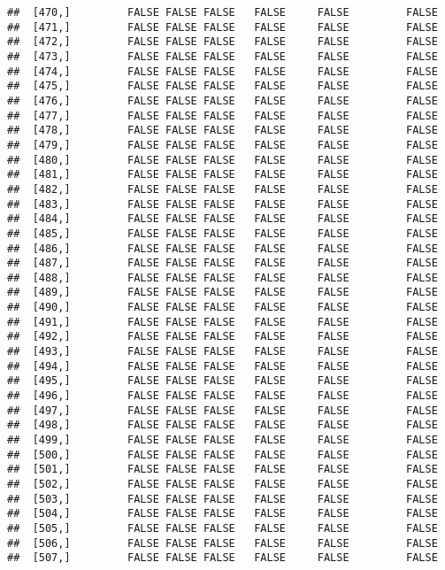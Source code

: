 \documentclass[
]{article}
\begin{document}
\begin{verbatim}
##  [470,]         FALSE FALSE FALSE   FALSE     FALSE         FALSE
##  [471,]         FALSE FALSE FALSE   FALSE     FALSE         FALSE
##  [472,]         FALSE FALSE FALSE   FALSE     FALSE         FALSE
##  [473,]         FALSE FALSE FALSE   FALSE     FALSE         FALSE
##  [474,]         FALSE FALSE FALSE   FALSE     FALSE         FALSE
##  [475,]         FALSE FALSE FALSE   FALSE     FALSE         FALSE
##  [476,]         FALSE FALSE FALSE   FALSE     FALSE         FALSE
##  [477,]         FALSE FALSE FALSE   FALSE     FALSE         FALSE
##  [478,]         FALSE FALSE FALSE   FALSE     FALSE         FALSE
##  [479,]         FALSE FALSE FALSE   FALSE     FALSE         FALSE
##  [480,]         FALSE FALSE FALSE   FALSE     FALSE         FALSE
##  [481,]         FALSE FALSE FALSE   FALSE     FALSE         FALSE
##  [482,]         FALSE FALSE FALSE   FALSE     FALSE         FALSE
##  [483,]         FALSE FALSE FALSE   FALSE     FALSE         FALSE
##  [484,]         FALSE FALSE FALSE   FALSE     FALSE         FALSE
##  [485,]         FALSE FALSE FALSE   FALSE     FALSE         FALSE
##  [486,]         FALSE FALSE FALSE   FALSE     FALSE         FALSE
##  [487,]         FALSE FALSE FALSE   FALSE     FALSE         FALSE
##  [488,]         FALSE FALSE FALSE   FALSE     FALSE         FALSE
##  [489,]         FALSE FALSE FALSE   FALSE     FALSE         FALSE
##  [490,]         FALSE FALSE FALSE   FALSE     FALSE         FALSE
##  [491,]         FALSE FALSE FALSE   FALSE     FALSE         FALSE
##  [492,]         FALSE FALSE FALSE   FALSE     FALSE         FALSE
##  [493,]         FALSE FALSE FALSE   FALSE     FALSE         FALSE
##  [494,]         FALSE FALSE FALSE   FALSE     FALSE         FALSE
##  [495,]         FALSE FALSE FALSE   FALSE     FALSE         FALSE
##  [496,]         FALSE FALSE FALSE   FALSE     FALSE         FALSE
##  [497,]         FALSE FALSE FALSE   FALSE     FALSE         FALSE
##  [498,]         FALSE FALSE FALSE   FALSE     FALSE         FALSE
##  [499,]         FALSE FALSE FALSE   FALSE     FALSE         FALSE
##  [500,]         FALSE FALSE FALSE   FALSE     FALSE         FALSE
##  [501,]         FALSE FALSE FALSE   FALSE     FALSE         FALSE
##  [502,]         FALSE FALSE FALSE   FALSE     FALSE         FALSE
##  [503,]         FALSE FALSE FALSE   FALSE     FALSE         FALSE
##  [504,]         FALSE FALSE FALSE   FALSE     FALSE         FALSE
##  [505,]         FALSE FALSE FALSE   FALSE     FALSE         FALSE
##  [506,]         FALSE FALSE FALSE   FALSE     FALSE         FALSE
##  [507,]         FALSE FALSE FALSE   FALSE     FALSE         FALSE

\end{verbatim}
\end{document}
